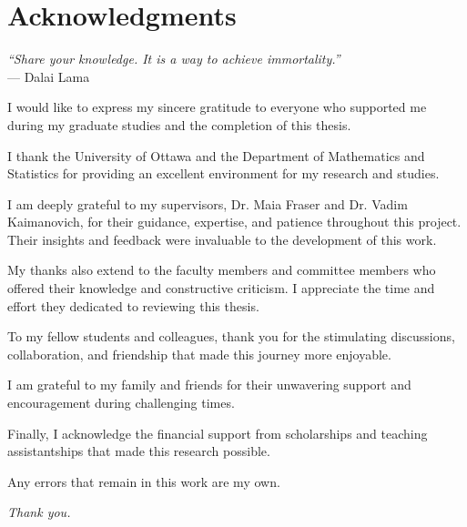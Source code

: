 \section{Acknowledgments}
\vspace{1cm}
\begin{center}
  \begin{minipage}[c]{0.7\linewidth}
    \begin{center}
      \vspace{0.5cm}
      \textit{``Share your knowledge. It is a way to achieve immortality.''} \\
      \hfill --- Dalai Lama
    \end{center}
  \end{minipage}
\end{center}

\vspace{1cm}

I would like to express my sincere gratitude to everyone who supported me during my graduate studies and the completion of this thesis.

I thank the University of Ottawa and the Department of Mathematics and Statistics for providing an excellent environment for my research and studies.

I am deeply grateful to my supervisors, Dr. Maia Fraser and Dr. Vadim Kaimanovich, for their guidance, expertise, and patience throughout this project. Their insights and feedback were invaluable to the development of this work.

My thanks also extend to the faculty members and committee members who offered their knowledge and constructive criticism. I appreciate the time and effort they dedicated to reviewing this thesis.

To my fellow students and colleagues, thank you for the stimulating discussions, collaboration, and friendship that made this journey more enjoyable.

I am grateful to my family and friends for their unwavering support and encouragement during challenging times.

Finally, I acknowledge the financial support from scholarships and teaching assistantships that made this research possible.

Any errors that remain in this work are my own.

\vspace{1cm}
\begin{center}
  \textit{Thank you.}
\end{center}


